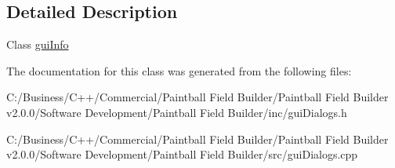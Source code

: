 \subsection{Detailed Description}
Class \hyperlink{classgui_info}{guiInfo} 

The documentation for this class was generated from the following files:\begin{DoxyCompactItemize}
\item 
C:/Business/C++/Commercial/Paintball Field Builder/Paintball Field Builder v2.0.0/Software Development/Paintball Field Builder/inc/guiDialogs.h\item 
C:/Business/C++/Commercial/Paintball Field Builder/Paintball Field Builder v2.0.0/Software Development/Paintball Field Builder/src/guiDialogs.cpp\end{DoxyCompactItemize}
